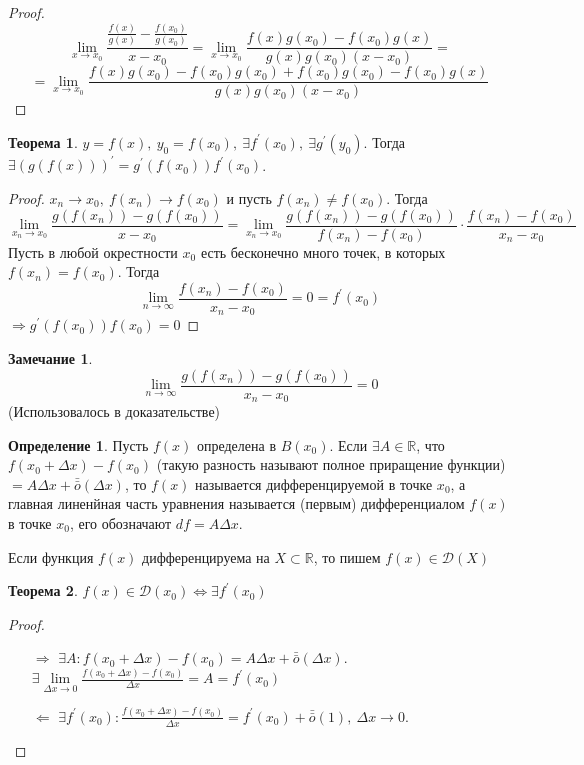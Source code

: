 \documentclass[a4paper, 12pt]{article}
\newcommand{\R}{\mathbb{R}}
\newcommand\tab[1][.5cm]{\hspace*{#1}}
\theoremstyle{definition}
\newtheorem*{definition}{Определение}
\newtheorem*{theorem}{Теорема}
\newtheorem*{comm}{Замечание}
\begin{document}
        \begin{proof}
            \[\lim\limits_{x\to x_0}\frac{\frac{f(x)}{g(x)}-\frac{f(x_0)}{g(x_0)}}{x-x_0}=\lim\limits_{x\to x_0}\frac{f(x)g(x_0)-f(x_0)g(x)}{g(x)g(x_0)(x-x_0)}=\]
            \[=\lim\limits_{x\to x_0}\frac{f(x)g(x_0)-f(x_0)g(x_0)+f(x_0)g(x_0)-f(x_0)g(x)}{g(x)g(x_0)(x-x_0)}\]
        \end{proof} 
        \begin{theorem}
            $y=f(x),\ y_0=f(x_0),\ \exists f^{\prime}(x_0),\ \exists g^{\prime}(y_0)$. Тогда\\
            $\exists (g(f(x)))^{\prime}=g^{\prime}(f(x_0))f^{\prime}(x_0)$.
        \end{theorem}
        \begin{proof}
            $x_n\to x_0,\ f(x_n)\to f(x_0)$ и пусть $f(x_n)\ne f(x_0)$. Тогда 
            \[\lim\limits_{x_n\to x_0}\frac{g(f(x_n))-g(f(x_0))}{x-x_0}=\lim\limits_{x_n\to x_0}\frac{g(f(x_n))-g(f(x_0))}{f(x_n)-f(x_0)}\cdot \frac{f(x_n)-f(x_0)}{x_n-x_0}\]
            Пусть в любой окрестности $x_0$ есть бесконечно много точек, в которых \\
            $f(x_n)=f(x_0)$. Тогда
            \[\lim\limits_{n\to \infty}\frac{f(x_n)-f(x_0)}{x_n-x_0}=0=f^{\prime}(x_0)\]
            $\Rightarrow g^{\prime}(f(x_0))f(x_0)=0$
        \end{proof}  
        \begin{comm}
            \[\lim\limits_{n\to \infty}\frac{g(f(x_n))-g(f(x_0))}{x_n-x_0}=0\] 
            (Использовалось в доказательстве)
        \end{comm}
        \begin{definition}
            Пусть $f(x)$ определена в $B(x_0)$. Если $\exists A\in \R$, что $f(x_0+\Delta x)-f(x_0)$ (такую разность называют полное приращение функции) $=A \Delta x+\bar{\bar{o}}{(\Delta x)}$, то $f(x)$ называется дифференцируемой в точке $x_0$, а главная линенйная часть уравнения называется (первым) дифференциалом $f(x)$ в точке $x_0$, его обозначают $df=A\Delta x$.
        \end{definition} 
        Если функция $f(x)$ дифференцируема на $X\subset \R$, то пишем $f(x)\in \mathcal{D}(X)$
        \begin{theorem}
            $f(x)\in \mathcal{D}(x_0) \Leftrightarrow \exists f^{\prime}(x_0)$
        \end{theorem}
        \begin{proof}
            \begin{itemize}\tab
                \item[$\Rightarrow$] $\exists A: f(x_0+\Delta x)-f(x_0)=A\Delta x+\bar{\bar{o}}{(\Delta x)}$. $\exists \lim\limits_{\Delta x\to 0}\frac{f(x_0+\Delta x)-f(x_0)}{\Delta x}=A=f^{\prime}(x_0)$
                \item[$\Leftarrow$] $\exists f^{\prime}(x_0): \frac{f(x_0+\Delta x)-f(x_0)}{\Delta x}=f^{\prime}(x_0)+\bar{\bar{o}}{(1)},\ \Delta x\to 0$. 
            \end{itemize}            
        \end{proof}  
\end{document}
